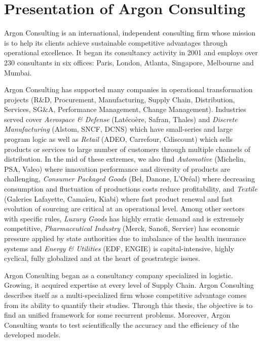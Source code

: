 \section{Presentation of Argon Consulting}


Argon Consulting is an international, independent consulting firm whose mission is to help its clients achieve sustainable competitive advantages through operational excellence.
It began its consultancy activity in 2001 and employs over 230 consultants in six offices: Paris, London, Atlanta, Singapore, Melbourne and Mumbai.


Argon Consulting has supported many companies in operational transformation projects (R\&D, Procurement, Manufacturing, Supply Chain, Distribution, Services, SG\&A, Performance Management, Change Management).
Industries served cover
\emph{Aerospace \& Defense} (Lat\'eco\`ere, Safran, Thales) and
\emph{Discrete Manufacturing} (Alstom, SNCF, DCNS) which have small-series and large program logic as well as
\emph{Retail} (ADEO, Carrefour, Cdiscount) which sells products or services to large number of customers through multiple channels of distribution.
In the mid of these extremes, we also find
\emph{Automotive} (Michelin, PSA, Valeo) where innovation performance and diversity of products are challenging,
\emph{Consumer Packaged Goods} (Bel, Danone, L'Oréal) where decreasing consumption and fluctuation of productions costs reduce profitability, and
\emph{Textile} (Galeries Lafayette, Cama\"ieu, Kiabi) where fast product renewal and fast evolution of sourcing are critical at an operational level.
Among other sectors with specific rules,
\emph{Luxury Goods} has highly erratic demand and is extremely competitive,
\emph{Pharmaceutical Industry} (Merck, Sanofi, Servier) has economic pressure applied by state authorities due to imbalance of the health insurance systems and
\emph{Energy \& Utilities} (EDF, ENGIE) is capital-intensive, highly cyclical, fully globalized and at the heart of geostrategic issues.


Argon Consulting began as a consultancy company specialized in logistic.
Growing, it acquired expertise at every level of Supply Chain.
Argon Consulting describes itself as a multi-specialized firm whose competitive advantage comes from its ability to quantify their studies.
Through this thesis, the objective is to find an unified framework for some recurrent problems.
Moreover, Argon Consulting wants to test scientifically the accuracy and the efficiency of the developed models.


